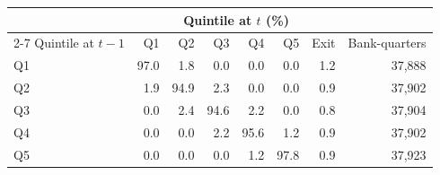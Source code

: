 \begin{tabular}{@{}lrrrrrrr@{}}
\toprule
 & \multicolumn{6}{c}{Quintile at $t$ (\%)} & \\
\cmidrule(lr){2-7}
Quintile at $t-1$ & Q1 & Q2 & Q3 & Q4 & Q5 & Exit & Bank-quarters \\
\midrule
Q1 & 97.0 & 1.8 & 0.0 & 0.0 & 0.0 & 1.2 & 37{,}888 \\
Q2 & 1.9 & 94.9 & 2.3 & 0.0 & 0.0 & 0.9 & 37{,}902 \\
Q3 & 0.0 & 2.4 & 94.6 & 2.2 & 0.0 & 0.8 & 37{,}904 \\
Q4 & 0.0 & 0.0 & 2.2 & 95.6 & 1.2 & 0.9 & 37{,}902 \\
Q5 & 0.0 & 0.0 & 0.0 & 1.2 & 97.8 & 0.9 & 37{,}923 \\
\bottomrule
\end{tabular}
